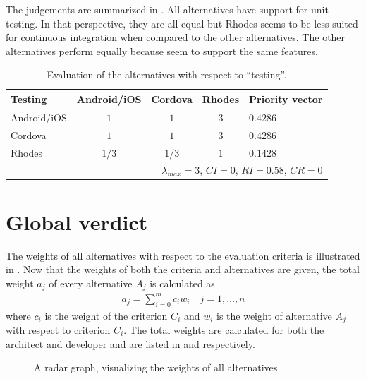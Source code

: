 The judgements are summarized in . All alternatives have support for unit testing. In that perspective, they are all equal but Rhodes seems to be less suited for continuous integration when compared to the other alternatives. The other alternatives perform equally because seem to support the same features.

\begin{table}[h!]
    \centering
    \begin{tabular}{lcccl}
        \hline
        \textbf{Testing} & Android/iOS & Cordova & Rhodes & Priority vector \\
        \hline
        Android/iOS      & $1$         & $1$     & $3$    & $0.4286$ \\
        Cordova          & $1$         & $1$     & $3$    & $0.4286$ \\
        Rhodes           & $1/3$       & $1/3$   & $1$    & $0.1428$ \\
        \hline
        \multicolumn{5}{r}{$\lambda_{max} = 3$, $CI = 0$, $RI = 0.58$, $CR = 0$}\\
        \hline
    \end{tabular}
    \caption{Evaluation of the alternatives with respect to ``testing''.}
    \label{tab:testing}
\end{table}

\section{Global verdict}

The weights of all alternatives with respect to the evaluation criteria is illustrated in . Now that the weights of both the criteria and alternatives are given, the total weight $a_j$ of every alternative $A_j$ is calculated as
\begin{gather*}
    a_j = \sum_{i = 0}^{m} c_i w_i \quad j = 1, \ldots, n
\end{gather*}
where $c_i$ is the weight of the criterion $C_i$ and $w_i$ is the weight of alternative $A_j$ with respect to criterion $C_i$. The total weights are calculated for both the architect and developer and are listed in  and  respectively. 

\begin{figure}
    \centering
    \caption{A radar graph, visualizing the weights of all alternatives}
    \label{fig:radar}
\end{figure}


